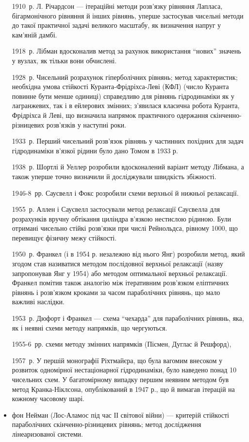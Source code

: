\begin{itemize}
    \item[1910~р.] Л. Річардсон --- ітераційні методи розв'язку рівняння Лапласа, бігармонічного рівняння й інших рівнянь, уперше застосував чисельні методи до такої практичної задачі великого масштабу, як визначення напруг у кам'яній дамбі. 
    \item[1918~р.] Лібман вдосконалив метод за рахунок використання ``нових'' значень у вузлах, як тільки вони обчислені. 
    \item[1928~р.] Чисельний розрахунок гіперболічних рівнянь; метод характеристик; необхідна умова стійкості Куранта-Фрідріхса-Леві (КФЛ) (число Куранта повинне бути менше одиниці) справедливо для рівнянь гідродинаміки як у лагранжевих, так і в ейлерових змінних; з'явилася класична робота Куранта, Фрідріхса й Леві, що визначила напрямок практичного одержання скінченно-різницевих розв'язків у наступні роки.
    \item[1933~р.] Перший чисельний розв'язок рівнянь у частинних похідних для задач гідродинаміки в'язкої рідини було дано Томом в 1933 р.
    \item[1938~р.] Шортлі й Уеллер розробили вдосконалений варіант методу Лібмана, а також уперше точно визначили й досліджували швидкість збіжності.
    \item[1946-8~рр.] Саусвелл і Фокс розробили схеми верхньої й нижньої релаксації.
    \item[1955~р.] Аллен і Саусвелл застосували метод релаксації Саусвелла для розрахунків вручну обтікання циліндра в'язкою нестислою рідиною. Були отримані чисельно стійкі розв'язки при числі Рейнольдса, рівному 1000, що перевищує фізичну межу стійкості. 
    \item[1950~р.] Франкел (і в 1954 р. незалежно від нього Янг) розробили метод, який згодом став називатися методом послідовної верхньої релаксації (назву запропонував Янг у 1954) або методом оптимальної верхньої релаксації. Франкел помітив також аналогію між ітеративним розв'язком еліптичних рівнянь і розв'язком кроками за часом параболічних рівнянь, що мало важливі наслідки.
    \item[1953~р.] Дюфорт і Франкел --- схема ``чехарда'' для параболічних рівнянь, яка, як і неявні схеми методу напрямків, що чергуються.
    \item[1955-6~рр.] схеми методу змінних напрямків (Пісмен, Дуглас й Решфорд),
    \item[1957~р.] У першій монографії Ріхтмайєра, що була вагомим внесоком у розвиток одномірної нестаціонарної гідродинаміки, було наведено понад 10 чисельних схем. У багатомірному випадку першим неявним методом був метод Кранка-Ніклсона, опублікований в 1947 р., що й вимагав ітерацій на кожному часовому шарі. 
    \item фон Нейман (Лос-Аламос під час ІІ світової війни) --- критерій стійкості параболічних скін\-чен\-но-різ\-ни\-це\-вих рівнянь; метод дослідження лінеаризованої системи. 
\end{itemize}

